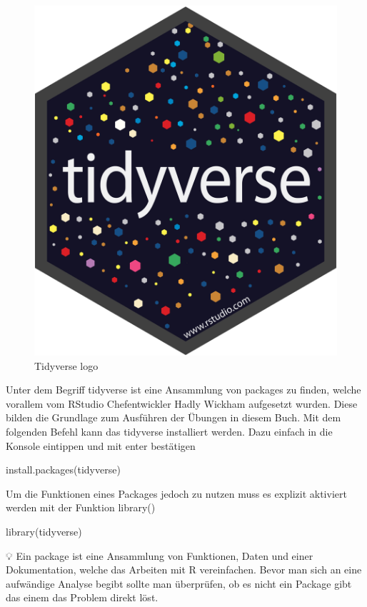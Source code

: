 \documentclass[
]{article}
\newenvironment{Shaded}{\begin{snugshade}}{\end{snugshade}}
\newcommand{\FunctionTok}[1]{\textcolor[rgb]{0.00,0.00,0.00}{#1}}
\newcommand{\NormalTok}[1]{#1}
\begin{document}
\begin{figure}

{\centering \includegraphics[width=0.5\linewidth]{images/006} 

}

\caption{Tidyverse logo}\label{fig:unnamed-chunk-10}
\end{figure}

Unter dem Begriff tidyverse ist eine Ansammlung von packages zu finden, welche vorallem vom RStudio Chefentwickler Hadly Wickham aufgesetzt wurden. Diese bilden die Grundlage zum Ausführen der Übungen in diesem Buch. Mit dem folgenden Befehl kann das tidyverse installiert werden. Dazu einfach in die Konsole eintippen und mit enter bestätigen

\begin{Shaded}
\begin{Highlighting}[]
\FunctionTok{install.packages}\NormalTok{(tidyverse)}
\end{Highlighting}
\end{Shaded}

Um die Funktionen eines Packages jedoch zu nutzen muss es explizit aktiviert werden mit der Funktion library()

\begin{Shaded}
\begin{Highlighting}[]
\FunctionTok{library}\NormalTok{(tidyverse)}
\end{Highlighting}
\end{Shaded}

💡 Ein package ist eine Ansammlung von Funktionen, Daten und einer Dokumentation, welche das Arbeiten mit R vereinfachen. Bevor man sich an eine aufwändige Analyse begibt sollte man überprüfen, ob es nicht ein Package gibt das einem das Problem direkt löst.
\end{document}
